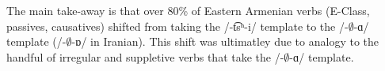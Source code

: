 The main take-away is that over 80\% of Eastern Armenian verbs (E-Class, passives, causatives) shifted from taking the /-\t{ts}ʰ-i/ template to the /-$\emptyset$-ɑ/ template (/-$\emptyset$-ɒ/ in Iranian). This shift was ultimatley due to analogy to the handful of irregular and suppletive verbs that take the /-$\emptyset$-ɑ/ template. 
